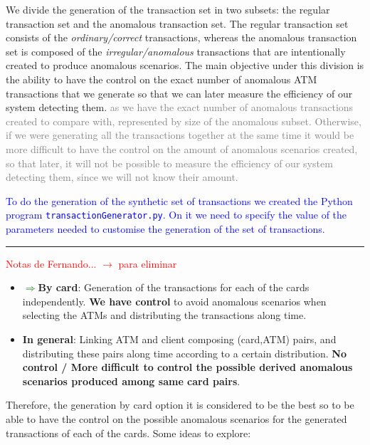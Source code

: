 We divide the generation of the transaction set in two subsets: the regular transaction set and the anomalous transaction set. The regular transaction set consists of the \emph{ordinary/correct} transactions, whereas the anomalous transaction set is composed of the \emph{irregular/anomalous} transactions that are intentionally created to produce anomalous scenarios.
The main objective under this division is the ability to have the control on the exact number of anomalous ATM transactions that we generate so that we can later measure the efficiency of our system detecting them. \textcolor{gray}{as we have the exact number of anomalous transactions created to compare with, represented by size of the anomalous subset. Otherwise, if we were generating all the transactions together at the same time it would be more difficult to have the control on the amount of anomalous scenarios created, so that later, it will not be possible to measure the efficiency of our system detecting them, since we will not know their amount.}


\textcolor{blue}{To do the generation of the synthetic set of transactions we created the Python program \texttt{transactionGenerator.py}. On it we need to specify the value of the parameters needed to customise the generation of the set of transactions.}

\textcolor{red}{\rule{\linewidth}{0.5mm}}
\textcolor{red}{Notas de Fernando... $\rightarrow$ para eliminar\\}

\begin{tcolorbox}
  \begin{itemize}
    \item \textcolor{green}{$\Rightarrow$}\textbf{By card}: Generation of the transactions for each of the cards independently. \textbf{We have
    control} to avoid anomalous scenarios when selecting the ATMs and distributing the transactions along time.
    \item \textbf{In general}: Linking ATM and client composing (card,ATM) pairs, and distributing these pairs along
    time according to a certain distribution. \textbf{No control / More difficult to control the possible derived
    anomalous scenarios produced among same card pairs}.
  \end{itemize}
\end{tcolorbox}

Therefore, the generation by card option it is considered to be the best so to be able to have the control
on the possible anomalous scenarios for the generated transactions of each of the cards. Some ideas to explore:

